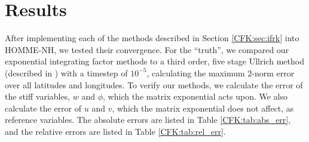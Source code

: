 \documentclass{csri19}
\begin{document}
\section{Results}\label{CFK:sec:results}
After implementing each of the methods described in Section 
\ref{CFK:sec:ifrk} into HOMME-NH, we tested their convergence. For the 
``truth'', we compared our exponential integrating factor methods to a 
third order, five stage Ullrich method (described in \cite{CFK:Guerra2016}) 
with a timestep of $10^{-5}$, calculating the maximum $2$-norm error over 
all latitudes and longitudes. To verify our methods, we calculate the error 
of the stiff variables, $w$ and $\phi$, which the matrix exponential acts 
upon. We also calculate the error of $u$ and $v$, which the matrix 
exponential does not affect, as reference variables. The absolute errors 
are listed in Table \ref{CFK:tab:abs_err}, and the relative errors are 
listed in Table \ref{CFK:tab:rel_err}.
\end{document}
